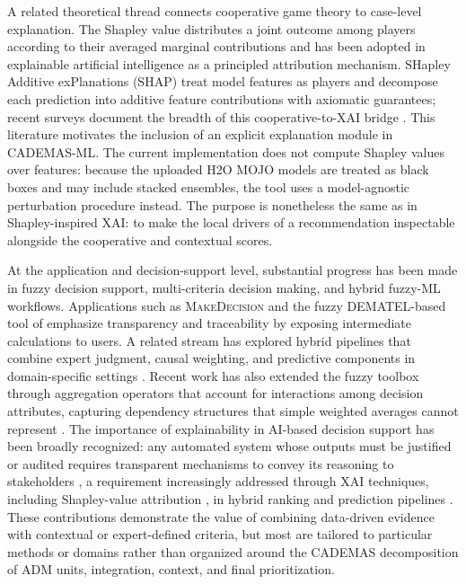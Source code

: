A related theoretical thread connects cooperative game theory to case-level explanation. The Shapley value distributes a joint outcome among players according to their averaged marginal contributions \citep{Borkotokey2019} and has been adopted in explainable artificial intelligence as a principled attribution mechanism. SHapley Additive exPlanations (SHAP) \citep{Lundberg2017} treat model features as players and decompose each prediction into additive feature contributions with axiomatic guarantees; recent surveys document the breadth of this cooperative-to-XAI bridge \citep{Li2024}. This literature motivates the inclusion of an explicit explanation module in CADEMAS-ML. The current implementation does not compute Shapley values over features: because the uploaded H2O MOJO models are treated as black boxes and may include stacked ensembles, the tool uses a model-agnostic perturbation procedure instead. The purpose is nonetheless the same as in Shapley-inspired XAI: to make the local drivers of a recommendation inspectable alongside the cooperative and contextual scores.

At the application and decision-support level, substantial progress has been made in fuzzy decision support, multi-criteria decision making, and hybrid fuzzy-ML workflows. Applications such as \textsc{MakeDecision} \citep{Wieckowski2024} and the fuzzy DEMATEL-based tool of \citet{Chekry2024} emphasize transparency and traceability by exposing intermediate calculations to users. A related stream has explored hybrid pipelines that combine expert judgment, causal weighting, and predictive components in domain-specific settings \citep{Abdulgader2018,Sahraei2022,Ozkurt2025}. Recent work has also extended the fuzzy toolbox through aggregation operators that account for interactions among decision attributes, capturing dependency structures that simple weighted averages cannot represent \citep{Kacprzyk2022}. The importance of explainability in AI-based decision support has been broadly recognized: any automated system whose outputs must be justified or audited requires transparent mechanisms to convey its reasoning to stakeholders \citep{Arrieta2020}, a requirement increasingly addressed through XAI techniques, including Shapley-value attribution \citep{Lundberg2017,Li2024}, in hybrid ranking and prediction pipelines \citep{Ozkurt2025}. These contributions demonstrate the value of combining data-driven evidence with contextual or expert-defined criteria, but most are tailored to particular methods or domains rather than organized around the CADEMAS decomposition of ADM units, integration, context, and final prioritization.

